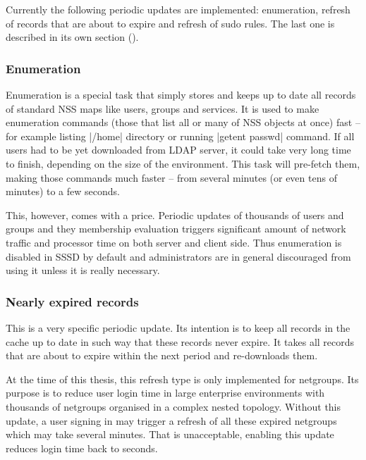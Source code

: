 Currently the following periodic updates are implemented: enumeration, refresh
of records that are about to expire and refresh of sudo rules. The last one is
described in its own section ().


\subsubsection{Enumeration}
\label{sssd:cache:periodic:enum}

Enumeration is a special task that simply stores and keeps up to date all
records of standard NSS maps like users, groups and services. It is used to make
enumeration commands (those that list all or many of NSS objects at once) fast
-- for example listing |/home| directory or running |getent passwd| command. If
all users had to be yet downloaded from LDAP server, it could take very long
time to finish, depending on the size of the environment. This task will
pre-fetch them, making those commands much faster -- from several minutes (or
even tens of minutes) to a few seconds.

This, however, comes with a price. Periodic updates of thousands of users and
groups and they membership evaluation triggers significant amount of network
traffic and processor time on both server and client side. Thus enumeration is
disabled in SSSD by default and administrators are in general discouraged from
using it unless it is really necessary.

\subsubsection{Nearly expired records}
\label{sssd:cache:periodic:expired}

This is a very specific periodic update. Its intention is to keep all records in
the cache up to date in such way that these records never expire. It takes all
records that are about to expire within the next period and re-downloads them.

At the time of this thesis, this refresh type is only implemented for netgroups.
Its purpose is to reduce user login time in large enterprise environments with
thousands of netgroups organised in a complex nested topology. Without this
update, a user signing in may trigger a refresh of all these expired netgroups
which may take several minutes. That is unacceptable, enabling this update
reduces login time back to seconds.

